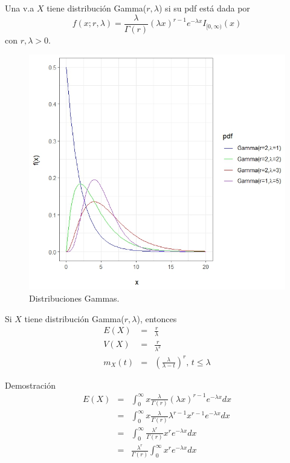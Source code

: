 \begin{i}
\begin{definition}
Una v.a $X$ tiene distribución Gamma($r,\lambda $) si su pdf está dada por 
\begin{equation*}
f(x;r,\lambda )=\frac{\lambda }{\Gamma (r)}\left( \lambda x\right)
^{r-1}e^{-\lambda x}I_{[0,\infty )}(x)
\end{equation*}
con $r,\lambda >0.$
\end{definition}

\begin{figure}[h!]
\centering
\includegraphics[scale=1]{Figuras/Gammas.jpeg}
\caption{Distribuciones Gammas.}
\end{figure}

\begin{theorem}
Si $X$ tiene distribución Gamma($r,\lambda$), entonces
\begin{eqnarray*}
E(X) &=&\frac{r}{\lambda } \\
V(X) &=&\frac{r}{\lambda ^{2}} \\
m_{X}(t) &=&\left( \frac{\lambda }{\lambda -t}\right) ^{r}\text{, \ }t\leq
\lambda
\end{eqnarray*}
\end{theorem}


Demostración
\begin{eqnarray*}
E(X) &=&\int_{0}^{\infty }x\frac{\lambda }{\Gamma (r)}\left( \lambda
x\right) ^{r-1}e^{-\lambda x}dx \\
&=&\int_{0}^{\infty }x\frac{\lambda }{\Gamma (r)}\lambda
^{r-1}x^{r-1}e^{-\lambda x}dx \\
&=&\int_{0}^{\infty }\frac{\lambda ^{r}}{\Gamma (r)}x^{r}e^{-\lambda x}dx \\
&=&\frac{\lambda ^{r}}{\Gamma (r)}\int_{0}^{\infty }x^{r}e^{-\lambda x}dx
\end{eqnarray*}


\end{i}
